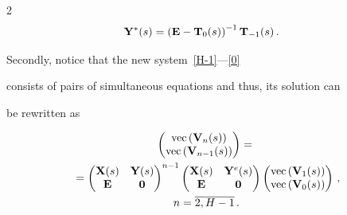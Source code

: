 \begin{multicols}{2}
\begin{align*}
\bmx{Y}^*(s)&=\left(\bmx{E}-\bmx{T}_0(s)\right)^{-1} \bmx{T}_{-1}(s)\,.


\end{align*}





\noindent Secondly, notice that the new system~\eqref{H-1}---\eqref{0}


 consists of pairs of simultaneous equations and thus, its solution can 


 be rewritten as


\begin{multline}


\label{v1}


\begin{pmatrix}


    \mathrm{vec}\left(\bmx{V}_{n}(s)\right) \\


    \mathrm{vec}\left(\bmx{V}_{n-1}(s)\right) 


\end{pmatrix}


={}\\


{}=


\begin{pmatrix}


    \bmx{X}(s) & \bmx{Y}(s) \\


    \bmx{E} & \bmx{0}


\end{pmatrix}^{n-1}


\begin{pmatrix}


    \bmx{X}(s) & \bmx{Y}^e(s) \\


    \bmx{E} & \bmx{0}


\end{pmatrix}


\begin{pmatrix}


    \mathrm{vec}\left(\bmx{V}_{1}(s)\right) \\


    \mathrm{vec}\left(\bmx{V}_{0}(s)\right)


\end{pmatrix}\,, \\


 n=\overline{2,H-1}\,.


\end{multline}









\end{multicols}
